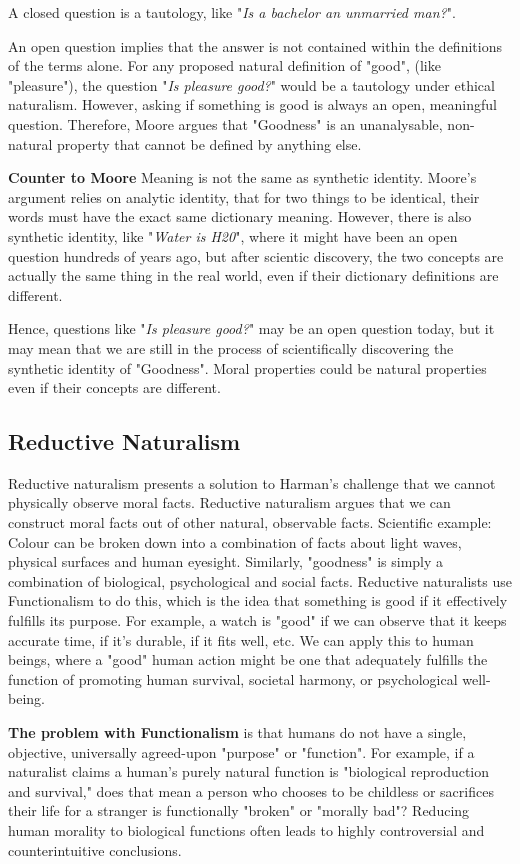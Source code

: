 \documentclass[12pt]{article}
\begin{document}
\noindent A closed question is a tautology, like "\textit{Is a bachelor an unmarried man?}".

\noindent An open question implies that the answer is not contained within the definitions of the terms alone.
For any proposed natural definition of "good", (like "pleasure"), the question
"\textit{Is pleasure good?}" would be a tautology under ethical naturalism.
However, asking if something is good is always an open, meaningful question.
Therefore, Moore argues that "Goodness" is an unanalysable, non-natural property that cannot be defined by anything else. 

\noindent\textbf{Counter to Moore} Meaning is not the same as synthetic identity.
Moore's argument relies on analytic identity, that for two things to be identical,
their words must have the exact same dictionary meaning.
However, there is also synthetic identity, like "\textit{Water is H20}", 
where it might have been an open question hundreds of years ago, but after scientic discovery, the two concepts are actually the same thing in the real world,
even if their dictionary definitions are different.

\noindent Hence, questions like "\textit{Is pleasure good?}" may be an open question today,
but it may mean that we are still in the process of scientifically discovering the synthetic identity of "Goodness". Moral properties could be natural properties even if their concepts are different.

\subsection{Reductive Naturalism}
Reductive naturalism presents a solution to Harman's challenge that we cannot physically observe moral facts.
Reductive naturalism argues that we can construct moral facts out of other natural, observable facts.
Scientific example: Colour can be broken down into a combination of facts about light waves, physical surfaces and human eyesight.
Similarly, "goodness" is simply a combination of biological, psychological and social facts.
Reductive naturalists use Functionalism to do this, which is the idea that something is good if it effectively fulfills its purpose.
For example, a watch is "good" if we can observe that it keeps accurate time, if it's durable, if it fits well, etc.
We can apply this to human beings, where a "good" human action might be one that adequately fulfills the function of promoting human survival,
societal harmony, or psychological well-being. 

\noindent\textbf{The problem with Functionalism} is that humans do not have a single, objective, universally agreed-upon "purpose" or "function".
For example, if a naturalist claims a human's purely natural function is "biological reproduction and survival," does that mean a person who chooses to be childless or sacrifices their life for a stranger is functionally "broken" or "morally bad"?
Reducing human morality to biological functions often leads to highly controversial and counterintuitive conclusions.
\end{document}
